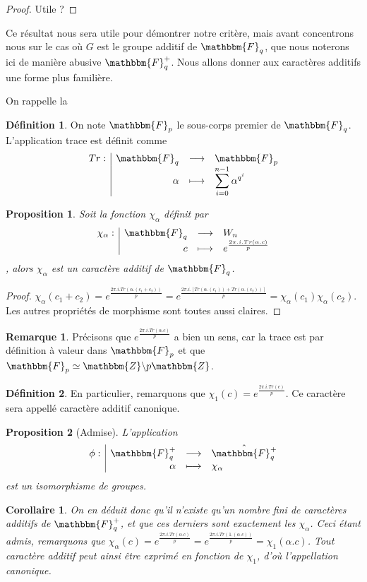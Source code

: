 \documentclass[12pt]{article}
\newcommand{\Z}{\mathbbm{Z}}
\newcommand{\Fp}{\mathbbm{F}_p}
\newcommand{\Fq}{\mathbbm{F}_q}
\newcommand{\fonction}[5]{
\begin{displaymath}
\begin{array}{l|rcl}
\displaystyle
#1 : & #2 & \longrightarrow & #3 \\
    & #4 & \longmapsto & #5
\end{array}
\end{displaymath}
}
\newtheorem{prop}{Proposition}
\newtheorem{cor}{Corollaire}
\theoremstyle{definition}\newtheorem{defn}{Définition}
\theoremstyle{definition}\newtheorem{exm}{Exemple}
\theoremstyle{definition}\newtheorem{rem}{Remarque}
\theoremstyle{definition}\newtheorem{algo}{Algorithme}
\theoremstyle{remark}\newtheorem{exo}{Exercice}
\theoremstyle{remark}\newtheorem{note}{Note}
\theoremstyle{remark}\newtheorem{nota}{Notation}
\begin{document}
\begin{proof}
Utile ?
\end{proof}

Ce résultat nous sera utile pour démontrer notre critère, mais avant concentrons nous sur le cas où $G$ est le groupe additif de $\Fq$, que nous noterons ici de manière abusive $\Fq^{+}$. Nous allons donner aux caractères additifs une forme plus familière.

On rappelle la 

\begin{defn}
On note $\Fp$ le sous-corps premier de $\Fq$. L'application trace est définit comme \fonction{Tr}{\Fq}{\Fp}{\alpha}{\displaystyle\sum_{i=0}^{n-1} \alpha^{q^i}}
\end{defn}

\begin{prop}
Soit la fonction $\chi_\alpha$ définit par \fonction{\chi_\alpha}{\Fq}{W_n}{c}{e^{\frac{2\pi.i.Tr(\alpha.c)}{p}}}, alors $\chi_\alpha$ est un caractère additif de $\Fq$.
\end{prop}

\begin{proof}
$\chi_\alpha(c_1 + c_2) = e^{\frac{2\pi.i.Tr(\alpha.(c_1 + c_2))}{p}} = e^{\frac{2\pi.i.[Tr(\alpha.(c_1))+Tr(\alpha.(c_2))]}{p}}=\chi_\alpha(c_1)\chi_\alpha(c_2)$. Les autres propriétés de morphisme sont toutes aussi claires.
\end{proof}

\begin{rem}
Précisons que $e^{\frac{2\pi.i.Tr(\alpha.c)}{p}}$ a bien un sens, car la trace est par définition à valeur dans $\Fp$ et que $\Fp \simeq \Z\backslash p\Z$.
\end{rem}

\begin{defn}
En particulier, remarquons que $\chi_1(c) = e^{\frac{2\pi.i.Tr(c)}{p}}$. Ce caractère sera appellé caractère additif canonique.
\end{defn}

\begin{prop}[Admise]
L'application \fonction{\phi}{\Fq^+}{\hat{\Fq^+}}{\alpha}{\chi_\alpha} est un isomorphisme de groupes.
\end{prop}

\begin{cor}
On en déduit donc qu'il n'existe qu'un nombre fini de caractères additifs de $\Fq^+$, et que ces derniers sont exactement les $\chi_\alpha$. Ceci étant admis, remarquons que $\chi_\alpha(c) = e^{\frac{2\pi.i.Tr(\alpha.c)}{p}} = e^{\frac{2\pi.i.Tr(1.(\alpha.c))}{p}} = \chi_1(\alpha.c)$. Tout caractère additif peut ainsi être exprimé en fonction de $\chi_1$, d'où l'appellation canonique.
\end{cor}
\end{document}
